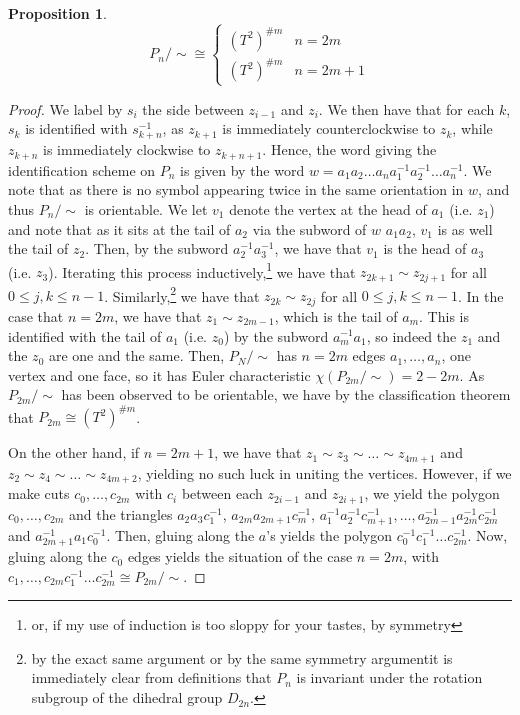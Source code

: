 \documentclass[english]{article}
\newcommand{\prt}[1]{\setcounter{subsection}{#1-1}\subsection{}}
\newtheorem*{prop}{Proposition}
\theoremstyle{remark}
\theoremstyle{definition}
\begin{document}
\prt{2}
\begin{prop}
	\begin{equation*}P_n/\sim\cong\begin{cases}
	(T^2)^{\#m} &n=2m\\
	(T^2)^{\#m} &n=2m+1
	\end{cases}\end{equation*}
\end{prop}
\begin{proof}
We label by $s_i$ the side between $z_{i-1}$ and $z_i$. We then have that for each $k$, $s_k$ is identified with $s_{k+n}^{-1}$, as $z_{k+1}$ is immediately counterclockwise to $z_k$, while $z_{k+n}$ is immediately clockwise to $z_{k+n+1}$. Hence, the word giving the identification scheme on $P_n$ is given by the word $w=a_1a_2\hdots a_n a_1^{-1}a_2^{-1}\dots a_n^{-1}$. We note that as there is no symbol appearing twice in the same orientation in $w$, and thus $P_n/\sim$ is orientable. We let $v_1$ denote the vertex at the head of $a_1$ (i.e. $z_1$) and note that as it sits at the tail of $a_2$ via the subword of $w$ $a_1a_2$, $v_1$ is as well the tail of $z_2$. Then, by the subword $a_2^{-1}a_{3}^{-1}$, we have that $v_1$ is the head of $a_3$ (i.e. $z_3$). Iterating this process inductively,\footnote{or, if my use of induction is too sloppy for your tastes, by symmetry} we have that $z_{2k+1}\sim z_{2j+1}$ for all $0\leq j,k\leq n-1$. Similarly,\footnote{by the exact same argument or by the same symmetry argument\textemdash it is immediately clear from definitions that $P_n$ is invariant under the rotation subgroup of the dihedral group $D_{2n}$.} we have that $z_{2k}\sim z_{2j}$ for all $0\leq j,k\leq n-1$. In the case that $n=2m$, we have that $z_1\sim z_{2m-1}$, which is the tail of $a_m$. This is identified with the tail of $a_1$ (i.e. $z_0$) by the subword $a_m^{-1}a_1$, so indeed the  $z_1$ and the  $z_0$ are one and the same. Then, $P_N/\sim$ has $n=2m$ edges $a_1,\dots,a_n$, one vertex and one face, so it has Euler characteristic $\chi(P_{2m}/\sim)=2-2m$. As $P_{2m}/\sim$ has been observed to be orientable, we have by the classification theorem that $P_{2m}\cong (T^2)^{\#m}$. 

On the other hand, if $n=2m+1$, we have that $z_1\sim z_3\sim \hdots \sim z_{4m+1}$ and $z_2\sim z_4\sim \hdots \sim z_{4m+2}$, yielding no such luck in uniting the vertices. However, if we make cuts $c_0,\hdots, c_{2m}$ with $c_i$ between each $z_{2i-1}$ and $z_{2i+1}$, we yield the polygon $c_0,\hdots,c_{2m}$ and the triangles $a_2a_3c_{1}^{-1}$, \textellipsis $a_{2m}a_{2m+1}c_m^{-1}$, $a_1^{-1}a_2^{-1}c_{m+1}^{-1},\hdots,a_{2m-1}^{-1}a_{2m}^{-1}c_{2m}^{-1}$ and $a_{2m+1}^{-1}a_1c_0^{-1}$. Then, gluing along the $a$'s yields the polygon $c_0^{-1}c_1^{-1}\dots c_{2m}^{-1}$. Now, gluing along the $c_0$ edges yields the situation of the case $n=2m$, with $c_1,\hdots,c_{2m}c_1^{-1}\dots c_{2m}^{-1}\cong P_{2m}/\sim$. 
\end{proof}
\end{document}
